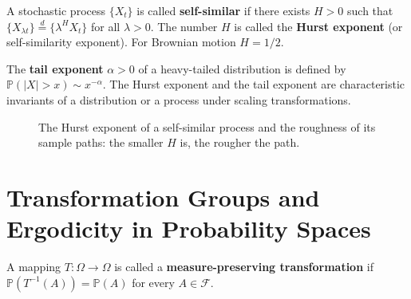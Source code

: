 \begin{definition}\label{ch14_scale_invariance}
A stochastic process $\{X_t\}$ is called \textbf{self-similar} if there exists $H > 0$ such that $\{X_{\lambda t}\} \stackrel{d}{=} \{\lambda^H X_t\}$ for all $\lambda > 0$. The number $H$ is called the \textbf{Hurst exponent} (or self-similarity exponent). For Brownian motion $H = 1/2$.

The \textbf{tail exponent} $\alpha > 0$ of a heavy-tailed distribution is defined by $\mathbb{P}(|X| > x) \sim x^{-\alpha}$. The Hurst exponent and the tail exponent are characteristic invariants of a distribution or a process under scaling transformations.
\end{definition}

\begin{figure}[htbp]
\centering
{}
\caption{The Hurst exponent of a self-similar process and the roughness of its sample paths: the smaller $H$ is, the rougher the path.}
\label{fig:self_similar}
\end{figure}

\section{Transformation Groups and Ergodicity in Probability Spaces}\label{sec:ergodicity}

\begin{definition}\label{def:measure_preserving}
A mapping $T: \Omega \to \Omega$ is called a \textbf{measure-preserving transformation} if $\mathbb{P}(T^{-1}(A)) = \mathbb{P}(A)$ for every $A \in \mathcal{F}$.
\end{definition}

